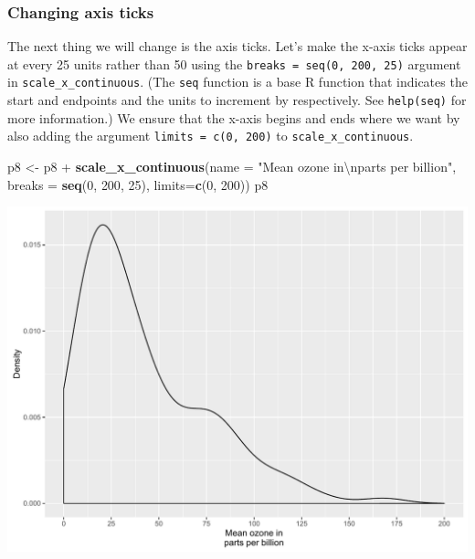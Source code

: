 \documentclass[]{article}
\newenvironment{Shaded}{\begin{snugshade}}{\end{snugshade}}
\newcommand{\KeywordTok}[1]{\textcolor[rgb]{0.13,0.29,0.53}{\textbf{{#1}}}}
\newcommand{\DataTypeTok}[1]{\textcolor[rgb]{0.13,0.29,0.53}{{#1}}}
\newcommand{\DecValTok}[1]{\textcolor[rgb]{0.00,0.00,0.81}{{#1}}}
\newcommand{\CharTok}[1]{\textcolor[rgb]{0.31,0.60,0.02}{{#1}}}
\newcommand{\StringTok}[1]{\textcolor[rgb]{0.31,0.60,0.02}{{#1}}}
\newcommand{\NormalTok}[1]{{#1}}
\begin{document}
\subsubsection{Changing axis ticks}\label{changing-axis-ticks-1}

The next thing we will change is the axis ticks. Let's make the x-axis
ticks appear at every 25 units rather than 50 using the
\texttt{breaks\ =\ seq(0,\ 200,\ 25)} argument in
\texttt{scale\_x\_continuous}. (The \texttt{seq} function is a base R
function that indicates the start and endpoints and the units to
increment by respectively. See \texttt{help(seq)} for more information.)
We ensure that the x-axis begins and ends where we want by also adding
the argument \texttt{limits\ =\ c(0,\ 200)} to
\texttt{scale\_x\_continuous}.

\begin{Shaded}
\begin{Highlighting}[]
\NormalTok{p8 <-}\StringTok{ }\NormalTok{p8 +}\StringTok{ }\KeywordTok{scale_x_continuous}\NormalTok{(}\DataTypeTok{name =} \StringTok{"Mean ozone in}\CharTok{\textbackslash{}n}\StringTok{parts per billion"}\NormalTok{,}
                              \DataTypeTok{breaks =} \KeywordTok{seq}\NormalTok{(}\DecValTok{0}\NormalTok{, }\DecValTok{200}\NormalTok{, }\DecValTok{25}\NormalTok{),}
                              \DataTypeTok{limits=}\KeywordTok{c}\NormalTok{(}\DecValTok{0}\NormalTok{, }\DecValTok{200}\NormalTok{))}
\NormalTok{p8}
\end{Highlighting}
\end{Shaded}

\begin{center}\includegraphics{0_all_posts_pdf/density_4-1} \end{center}
\end{document}
